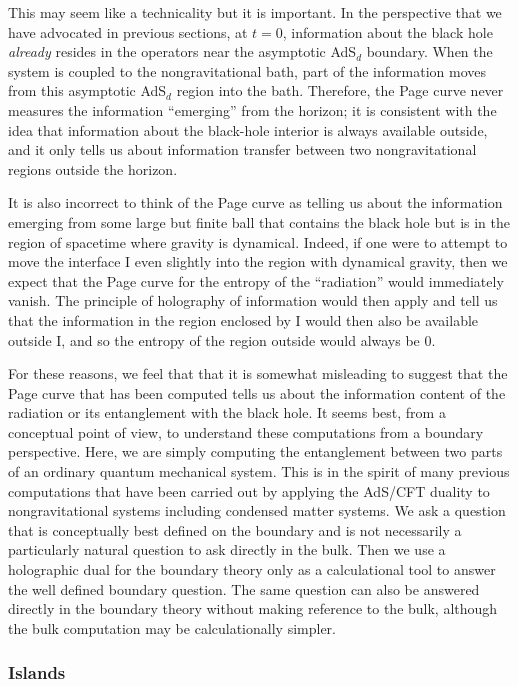 \documentclass[12pt]{article}
\begin{document}
This may seem like a technicality but it is important. In the perspective that we have advocated in previous sections, at $t = 0$, information about the black hole {\em already} resides in the operators near the asymptotic AdS$_d$ boundary. When the system is coupled to the nongravitational bath, part of the information moves from this asymptotic AdS$_d$ region into the bath. Therefore, the Page curve  never measures
the information ``emerging'' from the horizon; it is consistent with the idea that information about the black-hole interior is always available outside,  and it only tells us  about information transfer between two nongravitational regions outside the horizon.

It is also incorrect to think of the Page curve as telling us about the information emerging from some large but finite ball that contains the black hole but is in the region of spacetime where gravity is dynamical.  Indeed, if one were to attempt to move the interface I  even slightly into the region with dynamical gravity,  then we expect that the Page curve for the entropy of the ``radiation'' would immediately vanish. The principle of holography of information would then apply and tell us that the information in the region enclosed by I would then also be available outside I, and so the entropy of the region outside would always be 0.

For these reasons, we feel that that it is somewhat misleading to suggest that the Page curve that has been computed tells us about the information content of the radiation or its entanglement with the black hole.
It seems best,  from a conceptual point of view, to understand these computations from a boundary perspective. Here, we are simply computing the entanglement between two parts of an ordinary quantum mechanical system. This is in the spirit of many previous computations that have been carried out by applying the AdS/CFT duality to nongravitational systems including condensed matter systems. We ask a question that is conceptually best defined on the boundary and is not necessarily a particularly natural question to ask directly in the bulk. Then we use a holographic dual for the boundary theory only as a  calculational tool to answer the well defined boundary question. The same question can also be answered directly in the boundary theory \cite{Sully:2020pza} without making reference to the bulk, although the bulk computation may be calculationally simpler.

\subsubsection{Islands \label{secislands}}
\end{document}
